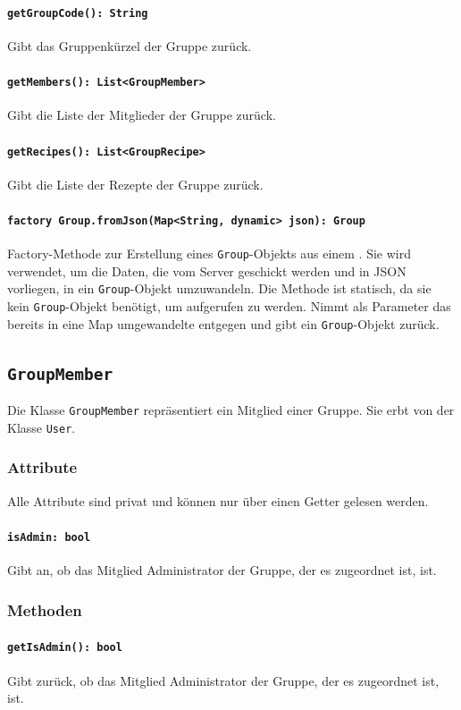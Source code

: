\documentclass{entwurfsheft}
\begin{document}
\paragraph{\texttt{getGroupCode(): String}}
Gibt das Gruppenkürzel der Gruppe zurück.
\paragraph{\texttt{getMembers(): List<GroupMember>}}
Gibt die Liste der Mitglieder der Gruppe zurück.
\paragraph{\texttt{getRecipes(): List<GroupRecipe>}}
Gibt die Liste der Rezepte der Gruppe zurück.
\paragraph{\texttt{factory Group.fromJson(Map<String, dynamic> json): Group}} Factory-Methode zur Erstellung eines \texttt{Group}-Objekts aus einem . Sie wird verwendet, um die Daten, die vom Server geschickt werden und in \Gls{JSON} vorliegen, in ein \texttt{Group}-Objekt umzuwandeln. Die Methode ist statisch, da sie kein \texttt{Group}-Objekt benötigt, um aufgerufen zu werden. Nimmt als Parameter das bereits in eine Map umgewandelte  entgegen und gibt ein \texttt{Group}-Objekt zurück.

\newpage
\subsection{\texttt{GroupMember}}\label{sec:GroupMember}
Die Klasse \texttt{GroupMember} repräsentiert ein Mitglied einer Gruppe. Sie erbt von der Klasse \texttt{User}.
\subsubsection*{Attribute}
Alle Attribute sind privat und können nur über einen Getter gelesen werden.
\paragraph{\texttt{isAdmin: bool}}
Gibt an, ob das Mitglied Administrator der Gruppe, der es zugeordnet ist, ist.
\subsubsection*{Methoden}
\paragraph{\texttt{getIsAdmin(): bool}}
Gibt zurück, ob das Mitglied Administrator der Gruppe, der es zugeordnet ist, ist.
\end{document}
